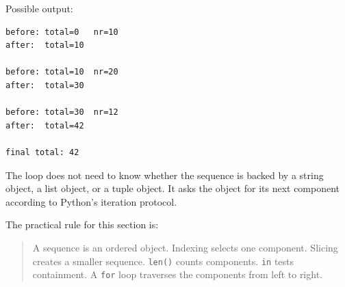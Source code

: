 Possible output:

\begin{verbatim}
before: total=0   nr=10
after:  total=10

before: total=10  nr=20
after:  total=30

before: total=30  nr=12
after:  total=42

final total: 42
\end{verbatim}

The loop does not need to know whether the sequence is backed by a string object, a list object, or a tuple object. It asks the object for its next component according to Python's iteration protocol.

The practical rule for this section is:

\begin{quote}
A sequence is an ordered object. Indexing selects one component. Slicing creates a smaller sequence. \texttt{len()} counts components. \texttt{in} tests containment. A \texttt{for} loop traverses the components from left to right.
\end{quote}